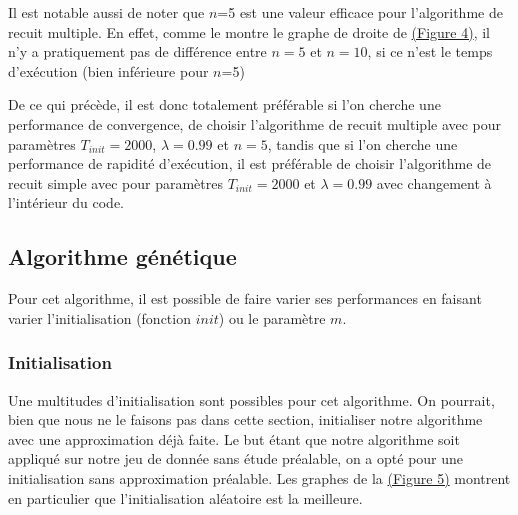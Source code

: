 \documentclass[11pt,french]{report}
\begin{document}
        Il est notable aussi de noter que $n$=5 est une valeur efficace pour l'algorithme de recuit multiple. En effet, comme le montre le graphe de droite de \hyperref[Figure4]{(Figure 4)}, il n'y a pratiquement pas de différence entre $n=5$ et $n=10$, si ce n'est le temps d'exécution (bien inférieure pour $n$=5)


        De ce qui précède, il est donc totalement préférable si l'on cherche une performance de convergence, de choisir l'algorithme de recuit multiple avec pour paramètres $T_{init} = 2000$,  $\lambda = 0.99$ et $n=5$, tandis que si l'on cherche une performance de rapidité d'exécution, il est préférable de choisir l'algorithme de recuit simple avec pour paramètres $T_{init} = 2000$ et $\lambda = 0.99$ avec changement à l'intérieur du code.


        \subsection{Algorithme génétique}
        Pour cet algorithme, il est possible de faire varier ses performances en faisant varier l'initialisation (fonction $init$) ou le paramètre \hyperref[sélection]{$m$}.

        \subsubsection{Initialisation}
        
        Une multitudes d'initialisation sont possibles pour cet algorithme. On pourrait, bien que nous ne le faisons pas dans cette section, initialiser notre algorithme avec une approximation déjà faite. Le but étant que notre algorithme soit appliqué sur notre jeu de donnée sans étude préalable, on a opté pour une initialisation sans approximation préalable. Les graphes de la \hyperref[Figure5]{(Figure 5)} montrent en particulier que l'initialisation aléatoire est la meilleure.
\end{document}
